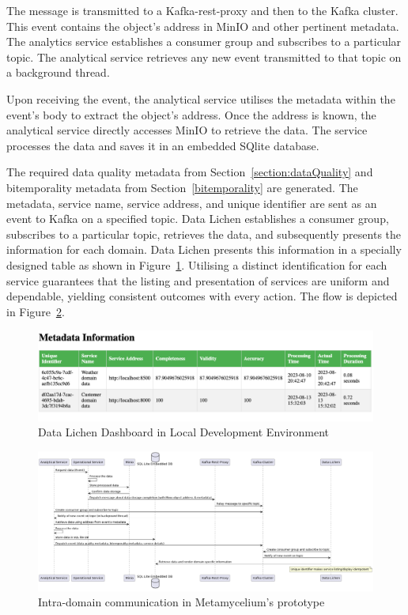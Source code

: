 \documentclass[journal]{IEEEtran}
\begin{document}
The message is transmitted to a Kafka-rest-proxy and then to the Kafka cluster. This event contains the object's address in MinIO and other pertinent metadata. The analytics service establishes a consumer group and subscribes to a particular topic. The analytical service retrieves any new event transmitted to that topic on a background thread. 

Upon receiving the event, the analytical service utilises the metadata within the event's body to extract the object's address. Once the address is known, the analytical service directly accesses MinIO to retrieve the data. The service processes the data and saves it in an embedded SQlite database. 

The required data quality metadata from Section~\ref{section:dataQuality} and bitemporality metadata from Section~\ref{bitemporality} are generated. The metadata, service name, service address, and unique identifier are sent as an event to Kafka on a specified topic. Data Lichen establishes a consumer group, subscribes to a particular topic, retrieves the data, and subsequently presents the information for each domain. Data Lichen presents this information in a specially designed table as shown in Figure~\ref{dataLichenDashboard}. Utilising a distinct identification for each service guarantees that the listing and presentation of services are uniform and dependable, yielding consistent outcomes with every action. The flow is depicted in Figure~\ref{intraDomain}.

\begin{figure}[h]
  \centering
  \includegraphics[width=\textwidth]{images/Datalichen-dashboard.png}
  \caption{Data Lichen Dashboard in Local Development Environment} 
  \label{dataLichenDashboard}
\end{figure}

\begin{figure}[h]
  \centering
  \includegraphics[width=\textwidth]{images/intra-domain-flow.jpg}
  \caption{Intra-domain communication in Metamycelium's prototype}
  \label{intraDomain}
\end{figure}
\end{document}
